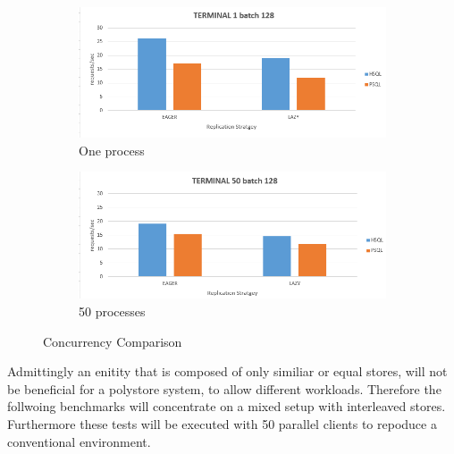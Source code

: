 \begin{figure}
    \centering
    \begin{subfigure}{.5\textwidth}
      \centering
      \includegraphics[width=.9\linewidth]{Figures/terminal1.PNG}
      \caption{One process}
      \label{fig:terminal1}
    \end{subfigure}%
    \begin{subfigure}{.5\textwidth}
      \centering
      \includegraphics[width=.9\linewidth]{Figures/terminal50.PNG}
      \caption{50 processes}
      \label{fig:terminal50}
    \end{subfigure}
    \caption{Concurrency Comparison}
    \label{fig:terminal}
\end{figure}


Admittingly an enitity that is composed of only similiar or equal stores, will not be beneficial for a polystore system, to allow different workloads.
Therefore the follwoing benchmarks will concentrate on a mixed setup with interleaved stores. Furthermore these tests will be executed with 50 parallel clients to repoduce a 
conventional environment. 



